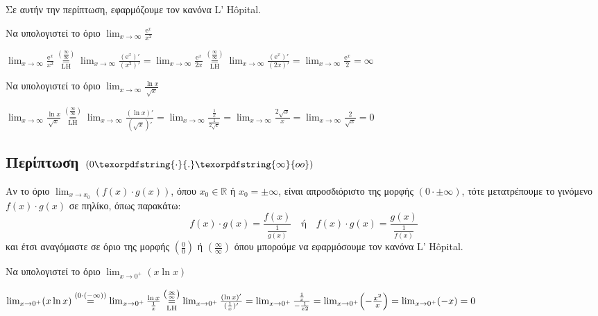 Σε αυτήν την περίπτωση, εφαρμόζουμε τον κανόνα L' H\^{o}pital.

\begin{example}
  Να υπολογιστεί το όριο $ \lim_{x \to \infty} \frac{\mathrm{e}^{x}}{x^{2}} $
\end{example}
\begin{solution}
  $ \lim_{x \to \infty} \frac{\mathrm{e}^{x}}{x^{2}}
  \overset{\left(\frac{\infty}{\infty}\right)}{\underset{\mathrm{LH}}{=}} \lim_{x \to
  \infty} \frac{(\mathrm{e}^{x} )'}{(x^{2})'} = \lim_{x \to \infty}
  \frac{\mathrm{e}^{x}}{2x}
  \overset{\left(\frac{\infty}{\infty}\right)}{\underset{\mathrm{LH}}{=}} 
  \lim_{x \to \infty} \frac{(\mathrm{e}^{x})'}{(2x)'} = \lim_{x \to \infty}
  \frac{\mathrm{e}^{x}}{2} = \infty
  $ 
\end{solution}

\begin{example}
  Να υπολογιστεί το όριο $ \lim_{x \to \infty} \frac{\ln{x}}{\sqrt{x}} $
\end{example}
\begin{solution}
  $ \lim_{x \to \infty} \frac{\ln{x}}{\sqrt{x}}
  \overset{\left(\frac{\infty}{\infty}\right)}{\underset{\mathrm{LH}}{=}} 
  \lim_{x \to \infty} \frac{(\ln{x} )'}{(\sqrt{x} )'} = \lim_{x \to \infty}
  \frac{\frac{1}{x}}{\frac{1}{2 \sqrt{x}}} = \lim_{x \to \infty} 
  \frac{2 \sqrt{x} }{x} = \lim_{x \to \infty} \frac{2}{\sqrt{x}} = 0
  $
\end{solution}


\subsection{Περίπτωση $ (0\texorpdfstring{\cdot}{.}\texorpdfstring{\infty}{oo}) $}

Αν το όριο $ \lim_{x \to x_{0}} \left(f(x)\cdot g(x)\right) $, όπου $ x_{0} \in
\mathbb{R} $ ή $ x_{0}= \pm \infty $, είναι απροσδιόριστο της μορφής $ (0 \cdot \pm
\infty) $, τότε μετατρέπουμε το γινόμενο $ f(x) \cdot g(x) $ σε πηλίκο, όπως παρακάτω:
\[
  f(x)\cdot g(x) = \frac{f(x)}{\frac{1}{g(x)}} \quad \text{ή} \quad
  f(x) \cdot g(x) = \frac{g(x)}{\frac{1}{f(x)}}  
\] 
και έτσι αναγόμαστε σε όριο της μορφής $ (\frac{0}{0}) $ ή $
(\frac{\infty}{\infty}) $ όπου μπορούμε να εφαρμόσουμε τον κανόνα L' H\^{o}pital.

\begin{example}
  Να υπολογιστεί το όριο $ \lim_{x \to 0^{+}} (x \ln{x}) $
\end{example}
\begin{solution}
  $ \lim_{x \to 0^{+}} (x \ln{x}) \overset{(0 \cdot (-\infty))}{=} \lim_{x \to 0^{+}}
  \frac{\ln{x}}{\frac{1}{x}}
  \overset{\left(\frac{\infty}{\infty}\right)}{\underset{\mathrm{LH}}{=}} 
  \lim_{x \to 0^{+}} \frac{(\ln{x} )'}{(\frac{1}{x} )'} = \lim_{x \to 0^{+}}
  \frac{\frac{1}{x}}{- \frac{1}{x{2}}} = \lim_{x \to 0^{+}} \Bigl(-\frac{x^{2}}{x}\Bigr) 
  = \lim_{x \to 0^{+}} (-x) = 0 $
\end{solution}

